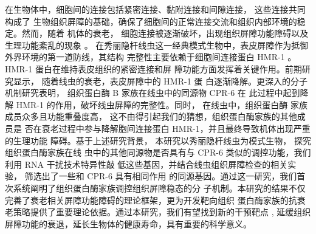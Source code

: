 在生物体中，细胞间的连接包括紧密连接、黏附连接和间隙连接， 这些连接共同构成了 生物组织屏障的基础，确保了细胞间的正常连接交流和组织内部环境的稳定。然而，随着 机体的衰老， 细胞连接被逐渐破坏，出现组织屏障功能障碍以及生理功能紊乱的现象 。 在秀丽隐杆线虫这一经典模式生物中，表皮屏障作为抵御外界环境的第一道防线，其结构 完整性主要依赖于细胞间连接蛋白 HMR-1 。HMR-1 蛋白在维持表皮组织的紧密连接和屏 障功能方面发挥着关键作用。前期研究显示， 随着线虫的衰老，表皮屏障中的 HMR-1 蛋 白逐渐降解。更深入的分子机制研究表明， 组织蛋白酶 B 家族在线虫中的同源物 CPR-6 在 此过程中起到降解 HMR-1 的作用，破坏线虫屏障的完整性。同时， 在线虫中，组织蛋白酶 家族成员众多且功能重叠度高， 这不由得引起我们的猜想，组织蛋白酶家族的其他成员是 否在衰老过程中参与降解胞间连接蛋白 HMR-1，并且最终导致机体出现严重的生理功能  障碍。基于上述研究背景， 本研究以秀丽隐杆线虫为模式生物， 探究组织蛋白酶家族在线  虫中的其他同源物是否具有与 CPR-6 类似的调控功能，我们利用 RNA 干扰技术特异性敲  低这些基因，并结合线虫组织屏障检查的相关实验， 筛选出了一些和 CPR-6 具有相同作用 的同源基因。通过这一研究，我们首次系统阐明了组织蛋白酶家族调控组织屏障稳态的分 子机制。本研究的结果不仅完善了衰老相关屏障功能障碍的理论框架，更为开发靶向组织 蛋白酶家族的抗衰老策略提供了重要理论依据。通过本研究，我们有望找到新的干预靶点 , 延缓组织屏障功能的衰退，延长生物体的健康寿命，具有重要的科学意义。
